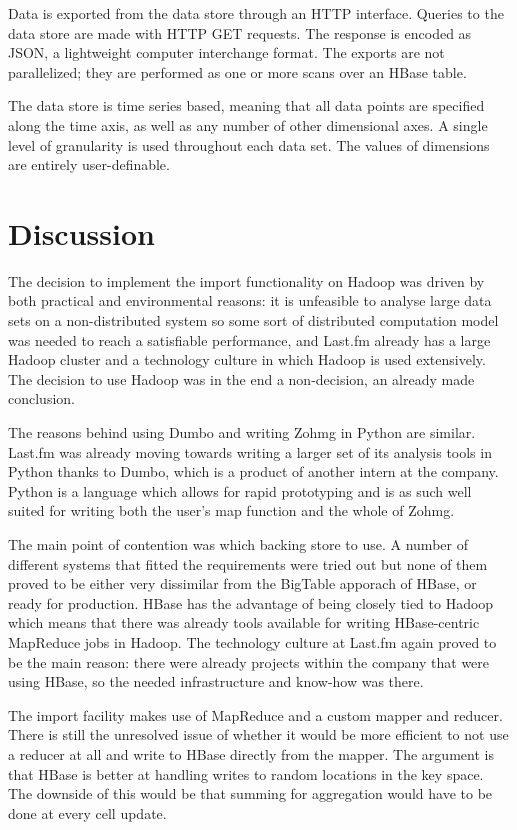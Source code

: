 Data is exported from the data store through an HTTP interface. Queries to the
data store are made with HTTP GET requests. The response is encoded as JSON, a
lightweight computer interchange format. The exports are not parallelized; they
are performed as one or more scans over an HBase table.

The data store is time series based, meaning that all data points are specified
along the time axis, as well as any number of other dimensional axes. A single
level of granularity is used throughout each data set. The values of dimensions
are entirely user-definable.


\section{Discussion}


The decision to implement the import functionality on Hadoop was driven by both
practical and environmental reasons: it is unfeasible to analyse large data sets
on a non-distributed system so some sort of distributed computation model was
needed to reach a satisfiable performance, and Last.fm already has a large
Hadoop cluster and a technology culture in which Hadoop is used extensively. The
decision to use Hadoop was in the end a non-decision, an already made
conclusion.

The reasons behind using Dumbo and writing Zohmg in Python are similar. Last.fm
was already moving towards writing a larger set of its analysis tools in Python
thanks to Dumbo, which is a product of another intern at the company. Python is
a language which allows for rapid prototyping and is as such well suited for
writing both the user's map function and the whole of Zohmg.

The main point of contention was which backing store to use. A number of
different systems that fitted the requirements were tried out but none of them
proved to be either very dissimilar from the BigTable apporach of HBase, or
ready for production. HBase has the advantage of being closely tied to
Hadoop which means that there was already tools available for writing
HBase-centric MapReduce jobs in Hadoop. The technology culture at Last.fm again
proved to be the main reason: there were already projects within the company
that were using HBase, so the needed infrastructure and know-how was there.

The import facility makes use of MapReduce and a custom mapper and reducer.
There is still the unresolved issue of whether it would be more efficient to not
use a reducer at all and write to HBase directly from the mapper. The argument
is that HBase is better at handling writes to random locations in the key space.
The downside of this would be that summing for aggregation would have to be done
at every cell update.

